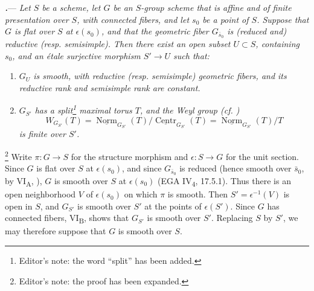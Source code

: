\par\medskip\noindent
{}\textbf{\textit{.}}---
\textit{Let \(S\) be a scheme, let \(G\) be an \(S\)-group scheme that
is affine and of finite presentation over \(S\), with connected
fibers, and let \(s_0\) be a point of \(S\).  Suppose that \(G\) is
flat over \(S\) at \(\epsilon(s_0)\), and that the geometric fiber
\(G_{\bar s_0}\) is (reduced and) reductive
\textup{(resp. semisimple)}.  Then there exist an open subset
\(U\subset S\), containing \(s_0\), and an étale surjective morphism
\(S'\to U\) such that:}

\begin{enumerate}
\item[\textit{\SGAInlineRefTarget{sga3:xix:theorem:2:5:item:i}(i)}]
\textit{\(G_U\) is smooth, with reductive
\textup{(resp. semisimple)} geometric fibers, and its reductive rank
and semisimple rank are constant.}

\item[\textit{\SGAInlineRefTarget{sga3:xix:theorem:2:5:item:ii}(ii)}]
\textit{\(G_{S'}\) has a split\footnote{Editor's note: the word
``split'' has been added.} maximal torus \(T\), and the Weyl group
\textup{(cf. )}}
\[
  W_{G_{S'}}(T)
  =
  \underline{\operatorname{Norm}}_{G_{S'}}(T)/
  \underline{\operatorname{Centr}}_{G_{S'}}(T)
  =
  \underline{\operatorname{Norm}}_{G_{S'}}(T)/T
\]
\textit{is finite over \(S'\).}
\end{enumerate}



\footnote{Editor's note: the proof has been expanded.}
Write \(\pi\colon G\to S\) for the structure morphism and
\(\epsilon\colon S\to G\) for the unit section.  Since \(G\) is flat
over \(S\) at \(\epsilon(s_0)\), and since \(G_{\bar s_0}\) is reduced
(hence smooth over \(\bar s_0\), by VI\textsubscript{A}, ),
\(G\) is smooth over \(S\) at \(\epsilon(s_0)\)
(EGA IV\textsubscript{4}, 17.5.1).  Thus there is an open
neighborhood \(V\) of \(\epsilon(s_0)\) on which \(\pi\) is smooth.
Then \(S'=\epsilon^{-1}(V)\) is open in \(S\), and \(G_{S'}\) is
smooth over \(S'\) at the points of \(\epsilon(S')\).  Since \(G\)
has connected fibers, VI\textsubscript{B},  shows that \(G_{S'}\)
is smooth over \(S'\).  Replacing \(S\) by \(S'\), we may therefore
suppose that \(G\) is smooth over \(S\).

